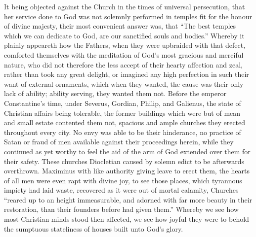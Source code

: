 It being objected against the Church in the times of universal persecution, that her service done to God was not solemnly performed in temples fit for the honour of divine majesty, their most convenient answer was, that “The best temples which we can dedicate to God, are our sanctified souls and bodies.” Whereby it plainly appeareth how the Fathers, when they were upbraided with that defect, comforted themselves with the meditation of God’s most gracious and merciful nature, who did not therefore the less accept of their hearty affection and zeal, rather than took any great delight, or imagined any high perfection in such their want of external ornaments, which when they wanted, the cause was their only lack of ability; ability serving, they wanted them not. Before the emperor Constantine’s time, under Severus, Gordian, Philip, and Galienus, the state of Christian affairs being tolerable, the former buildings which were but of mean and small estate contented them not, spacious and ample churches they erected throughout every city. No envy was able to be their hinderance, no practice of Satan or fraud of men available against their proceedings herein, while they continued as yet worthy to feel the aid of the arm of God extended over them for their safety. These churches Diocletian caused by  solemn edict to be afterwards overthrown. Maximinus with like authority giving leave to erect them, the hearts of all men were even rapt with divine joy, to see those places, which tyrannous impiety had laid waste, recovered as it were out of mortal calamity, Churches “reared up to an height immeasurable, and adorned with far more beauty in their restoration, than their founders before had given them.” Whereby we see how most Christian minds stood then affected, we see how joyful they were to behold the sumptuous stateliness of houses built unto God’s glory.
